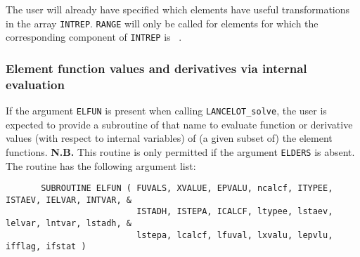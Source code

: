\documentclass{galahad}
\newcommand{\fullpackagename}{LANC\-E\-LOT}
\newcommand{\solver}{{\tt \fullpackagename\_solve}}
\begin{document}
The user will already have specified which elements have useful
transformations in the array {\tt INTREP}. {\tt RANGE} will only be called for
elements for which the corresponding component of {\tt INTREP} is \true\ .


\subsubsection{Element function values and derivatives via internal evaluation\label{efv}}

If the argument {\tt ELFUN} is present when calling \solver, the
user is expected to provide a subroutine of that name to evaluate
function or derivative values (with respect to internal variables)
of (a given subset of) the element functions.
{\bf N.B.} This routine is only permitted if the argument {\tt ELDERS}
is absent.
The routine has the following argument list:

\def\baselinestretch{0.8}
{\tt \begin{verbatim}
       SUBROUTINE ELFUN ( FUVALS, XVALUE, EPVALU, ncalcf, ITYPEE, ISTAEV, IELVAR, INTVAR, &
                          ISTADH, ISTEPA, ICALCF, ltypee, lstaev, lelvar, lntvar, lstadh, &
                          lstepa, lcalcf, lfuval, lxvalu, lepvlu, ifflag, ifstat )
\end{verbatim} }
\def\baselinestretch{1.0}
\end{document}
